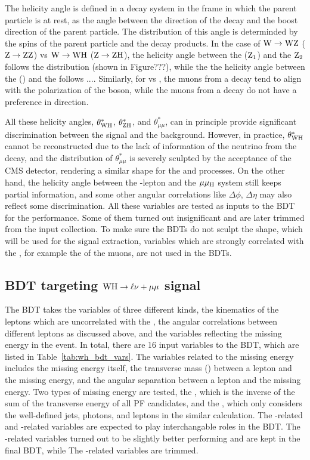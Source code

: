 The helicity angle is defined in a decay system in the frame in which the parent particle is at rest,
as the angle between the direction of the decay and the boost direction of the parent particle.
The distribution of this angle is determinded by the spins of the parent particle and the decay products.
In the case of $\mathrm{W} \to \mathrm{W}\mathrm{Z}$ ($\mathrm{Z} \to \mathrm{Z}\mathrm{Z}$) vs $\mathrm{W} \to \mathrm{W}\mathrm{H}$ ($\mathrm{Z} \to \mathrm{Z}\mathrm{H}$), the helicity angle between the \PW ($\mathrm{Z}_{1}$) and the $\mathrm{Z}_{2}$ follows the distribution (shown in Figure???),
while the the helicity angle between the \PW (\PZ) and the \PH follows ....
Similarly, for \zmm vs \hmm, the muons from a \PZ decay tend to align with the polarization of the \PZ boson, 
while the muons from a \PH decay do not have a preference in direction.

All these helicity angles, $\theta^{*}_{\mathrm{W}\mathrm{H}}$, $\theta^{*}_{\mathrm{Z}\mathrm{H}}$, and $\theta^{*}_{\mu\mu}$, 
can in principle provide significant discrimination between the signal and the background.
However, in practice, $\theta^{*}_{\mathrm{W}\mathrm{H}}$ cannot be reconstructed due to the lack of information of the neutrino from the \PW decay, 
and the distribution of $\theta^{*}_{\mu\mu}$ is severely sculpted by the acceptance of the CMS detector, 
rendering a similar shape for the \zmm and \hmm processes.
On the other hand, the helicity angle between the \PW-lepton and the $\mu\mu_{\mathrm{H}}$ system still keeps partial information, 
and some other angular correlations like $\Delta\phi$, $\Delta\eta$ may also reflect some discrimination.
All these variables are tested as inputs to the BDT for the performance.
Some of them turned out insignificant and are later trimmed from the input collection.
To make sure the BDTs do not sculpt the \mmm shape, which will be used for the signal extraction,
variables which are strongly correlated with the \mmm, for example the \pt of the muons, are not used in the BDTs.  


\subsection{BDT targeting \texorpdfstring{$\mathrm{W}\mathrm{H} \to \ell\nu+\mu\mu$}{WH to 3l} signal}\label{subsec:WHlep_BDT}

The \WH BDT takes the variables of three different kinds, the kinematics of the leptons which are uncorrelated with the \mmm,
the angular correlations between different leptons as discussed above, and the variables reflecting the missing energy in the event.
In total, there are 16 input variables to the BDT, which are listed in Table~\ref{tab:wh_bdt_vars}. 
The variables related to the missing energy includes the missing energy itself, 
the transverse mass (\MT) between a lepton and the missing energy, and the angular separation between a lepton and the missing energy.
Two types of missing energy are tested, the \MET, which is the inverse of the sum of the transverse energy of all PF candidates, 
and the \MHT, which only considers the well-defined jets, photons, and leptons in the similar calculation.
The \MET-related and \MHT-related variables are expected to play interchangable roles in the BDT.
The \MHT-related variables turned out to be slightly better performing and are kept in the final BDT,
while The \MET-related variables are trimmed.


